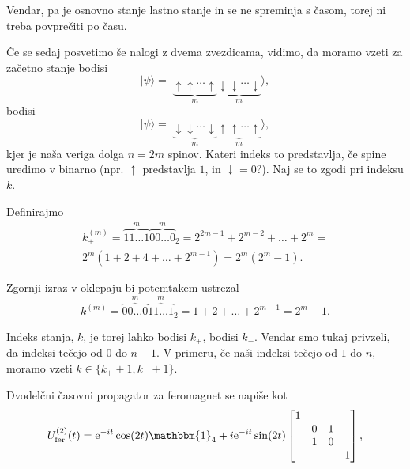 \documentclass[12pt, a4 paper]{article}
\newcommand{\e}{
	\ensuremath{\mathrm{e}}
}
\begin{document}
Vendar, pa je osnovno stanje lastno stanje in se ne spreminja s \v casom, torej ni treba povpre\v citi po \v casu.

\v Ce se sedaj posvetimo \v se nalogi z dvema zvezdicama, vidimo, da moramo vzeti za za\v cetno stanje bodisi
\[
	|\psi\rangle = |\underbrace{\uparrow\uparrow\ldots\uparrow}_{m}\underbrace{\downarrow\downarrow\ldots\downarrow}_{m}
		\rangle,
\]
bodisi
\[
	|\psi\rangle = |\underbrace{\downarrow\downarrow\ldots\downarrow}_{m}\underbrace{\uparrow\uparrow\ldots\uparrow}_{m}
		\rangle,
\]
kjer je na\v sa veriga dolga $n = 2m$ spinov. Kateri indeks to predstavlja, \v ce spine uredimo v binarno (npr. $\uparrow$
predstavlja $1$, in $\downarrow = 0$?). Naj se to zgodi pri indeksu $k$.

Definirajmo
\begin{multline}
	k_+^{(m)} = \overbrace{11\ldots1}^{m}\overbrace{00\ldots0}^{m}{}_2 = 2^{2m-1} + 2^{m-2} + \ldots + 2^m = \\
		2^m(1 + 2 + 4 + \ldots + 2^{m-1}) = 2^m (2^m - 1).
\end{multline}

Zgornji izraz v oklepaju bi potemtakem ustrezal
\begin{equation}
	k_-^{(m)} = \overbrace{00\ldots0}^{m}\overbrace{11\ldots1}^{m}{}_2 = 1 + 2 + \ldots + 2^{m-1} = 2^m-1.
\end{equation}

Indeks stanja, $k$, je torej lahko bodisi $k_+$, bodisi $k_-$. Vendar smo tukaj privzeli, da indeksi te\v cejo od $0$ do
$n-1$. V primeru, \v ce na\v si indeksi te\v cejo od $1$ do $n$, moramo vzeti $k \in \{k_+ + 1, k_- + 1\}$.

Dvodel\v cni \v casovni propagator za feromagnet se napi\v se kot
\[
	U^{(2)}_\text{fer}(t) = \e^{-it}\cos(2t)\mathbbm{1}_4 + i\e^{-it}\sin(2t) \begin{bmatrix}
		1 &  &  &  \\
		 & 0 & 1 &  \\
		 & 1 & 0 &  \\
		 &  &  & 1 \end{bmatrix},
\]
\end{document}

